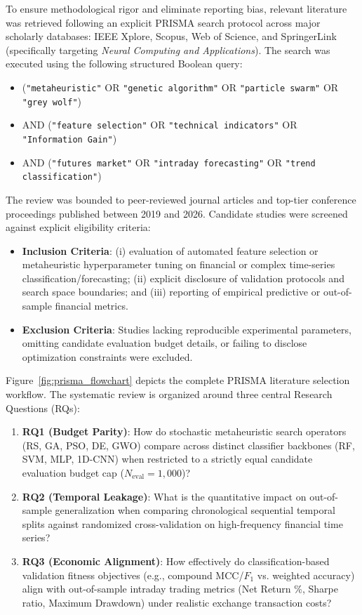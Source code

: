 To ensure methodological rigor and eliminate reporting bias, relevant literature was retrieved following an explicit PRISMA search protocol across major scholarly databases: IEEE Xplore, Scopus, Web of Science, and SpringerLink (specifically targeting \textit{Neural Computing and Applications}). The search was executed using the following structured Boolean query:
\begin{itemize}
    \item (\texttt{"metaheuristic"} OR \texttt{"genetic algorithm"} OR \texttt{"particle swarm"} OR \texttt{"grey wolf"})
    \item AND (\texttt{"feature selection"} OR \texttt{"technical indicators"} OR \texttt{"Information Gain"})
    \item AND (\texttt{"futures market"} OR \texttt{"intraday forecasting"} OR \texttt{"trend classification"})
\end{itemize}

The review was bounded to peer-reviewed journal articles and top-tier conference proceedings published between 2019 and 2026. Candidate studies were screened against explicit eligibility criteria:
\begin{itemize}
    \item \textbf{Inclusion Criteria}: (i) evaluation of automated feature selection or metaheuristic hyperparameter tuning on financial or complex time-series classification/forecasting; (ii) explicit disclosure of validation protocols and search space boundaries; and (iii) reporting of empirical predictive or out-of-sample financial metrics.
    \item \textbf{Exclusion Criteria}: Studies lacking reproducible experimental parameters, omitting candidate evaluation budget details, or failing to disclose optimization constraints were excluded.
\end{itemize}

Figure~\ref{fig:prisma_flowchart} depicts the complete PRISMA literature selection workflow. The systematic review is organized around three central Research Questions (RQs):
\begin{enumerate}
    \item \textbf{RQ1 (Budget Parity)}: How do stochastic metaheuristic search operators (RS, GA, PSO, DE, GWO) compare across distinct classifier backbones (RF, SVM, MLP, 1D-CNN) when restricted to a strictly equal candidate evaluation budget cap ($N_{\mathrm{eval}} = 1{,}000$)?
    \item \textbf{RQ2 (Temporal Leakage)}: What is the quantitative impact on out-of-sample generalization when comparing chronological sequential temporal splits against randomized cross-validation on high-frequency financial time series?
    \item \textbf{RQ3 (Economic Alignment)}: How effectively do classification-based validation fitness objectives (e.g., compound MCC/$F_1$ vs. weighted accuracy) align with out-of-sample intraday trading metrics (Net Return \%, Sharpe ratio, Maximum Drawdown) under realistic exchange transaction costs?
\end{enumerate}

